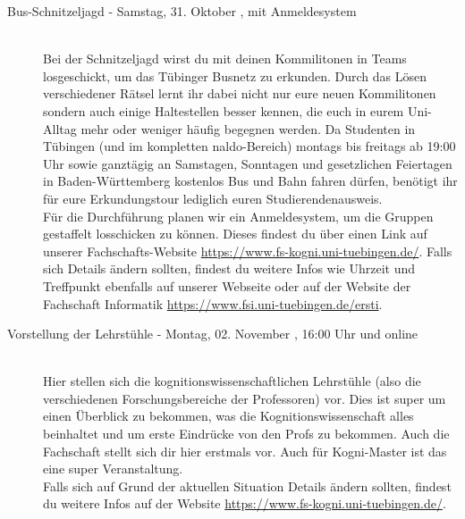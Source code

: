 \begin{description}
\ifkogwiss
\item[Bus-Schnitzeljagd - Samstag, 31. Oktober \YEAR, mit Anmeldesystem]\ \\
    Bei der Schnitzeljagd wirst du mit deinen Kommilitonen in Teams losgeschickt, um das Tübinger Busnetz zu erkunden. Durch das Lösen verschiedener Rätsel lernt ihr dabei nicht nur eure neuen Kommilitonen sondern auch einige Haltestellen besser kennen, die euch in eurem Uni-Alltag mehr oder weniger häufig begegnen werden. Da Studenten in Tübingen (und im kompletten naldo-Bereich) montags bis freitags ab 19:00 Uhr sowie ganztägig an Samstagen, Sonntagen und gesetzlichen Feiertagen in Baden-Württemberg kostenlos Bus und Bahn fahren dürfen, benötigt ihr für eure Erkundungstour lediglich euren Studierendenausweis.\\
    Für die Durchführung planen wir ein Anmeldesystem, um die Gruppen gestaffelt losschicken zu können. Dieses findest du über einen Link auf unserer Fachschafts-Website \url{https://www.fs-kogni.uni-tuebingen.de/}.
    Falls sich Details ändern sollten, findest du weitere Infos wie Uhrzeit und Treffpunkt ebenfalls auf unserer Webseite oder auf der Website der Fachschaft Informatik \url{https://www.fsi.uni-tuebingen.de/ersti}.\\
\fi

\ifkogwiss
\item[Vorstellung der Lehrstühle - Montag, 02. November \YEAR, 16:00 Uhr und online]\ \\
    Hier stellen sich die kognitionswissenschaftlichen Lehrstühle (also die verschiedenen Forschungsbereiche der Professoren) vor. Dies ist super um einen Überblick zu bekommen, was die Kognitionswissenschaft alles beinhaltet und um erste Eindrücke von den Profs zu bekommen. Auch die Fachschaft stellt sich dir hier erstmals vor. %
    Auch für Kogni-Master ist das eine super Veranstaltung. \\
    Falls sich auf Grund der aktuellen Situation Details ändern sollten, findest du weitere Infos auf der Website \url{https://www.fs-kogni.uni-tuebingen.de/}.
    
\fi


\end{description}
